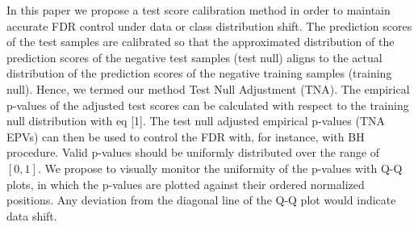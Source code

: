 \documentclass{article}
\begin{document}
In this paper we propose a test score calibration method in order to maintain accurate FDR control under data or class distribution shift. The prediction scores of the test samples are calibrated so that the approximated distribution of the prediction scores of the negative test samples (test null) aligns to the actual distribution of the prediction scores of the negative training samples (training null). Hence, we termed our method Test Null Adjustment (TNA). The empirical p-values of the adjusted test scores can be calculated with respect to the training null distribution with eq [1]. The test null adjusted empirical p-values (TNA EPVs)  can then be used to control the FDR with, for instance, with BH procedure. Valid p-values should be uniformly distributed over the range of $[0,1]$.  We propose to visually monitor the uniformity of the p-values with Q-Q plots, in which the p-values are plotted against their ordered normalized positions. Any deviation from the diagonal line of the Q-Q plot would indicate data shift.

\end{document}
